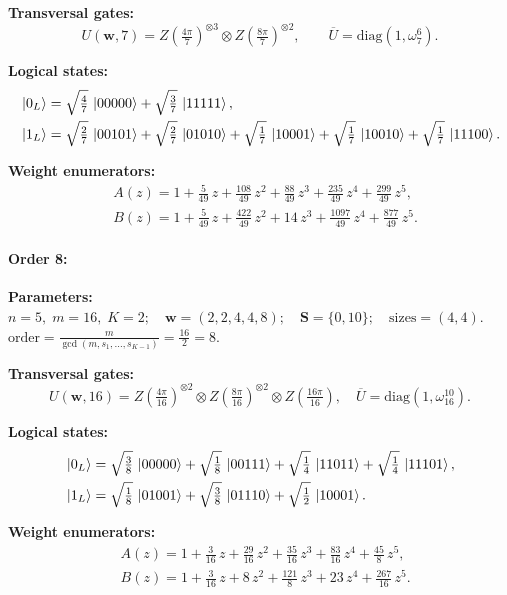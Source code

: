 \documentclass[pdflatex,sn-nature]{sn-jnl}%
\theoremstyle{thmstyleone}%
\theoremstyle{thmstyletwo}%
\theoremstyle{thmstylethree}%
\begin{document}
\begin{appendices}
\noindent\textbf{Transversal gates:}
\[
    U(\mathbf w,7)=Z \left(\tfrac{4\pi}{7}\right)^{\otimes3} \otimes Z \left(\tfrac{8\pi}{7}\right)^{\otimes2},\qquad
    \overline U=\mathrm{diag}(1,\omega_{7}^{6}).
\]

\noindent\textbf{Logical states:}
\begin{align*}
    &\ket{0_L} = \sqrt{\tfrac{4}{7}}\,\ket{00000} + \sqrt{\tfrac{3}{7}}\,\ket{11111}, \\
    &\ket{1_L} = \sqrt{\tfrac{2}{7}}\,\ket{00101} + \sqrt{\tfrac{2}{7}}\,\ket{01010} + \sqrt{\tfrac{1}{7}}\,\ket{10001} + \sqrt{\tfrac{1}{7}}\,\ket{10010} + \sqrt{\tfrac{1}{7}}\,\ket{11100}. 
\end{align*}

\noindent\textbf{Weight enumerators:}
\begin{align*}
    &A(z) = 1 + \tfrac{5}{49}\,z + \tfrac{108}{49}\,z^{2} + \tfrac{88}{49}\,z^{3} + \tfrac{235}{49}\,z^{4} + \tfrac{299}{49}\,z^{5}, \\
    &B(z) = 1 + \tfrac{5}{49}\,z + \tfrac{422}{49}\,z^{2} + 14\,z^{3} + \tfrac{1097}{49}\,z^{4} + \tfrac{877}{49}\,z^{5}.
\end{align*}

\paragraph{\textbf{Order 8:}}
\noindent\textbf{Parameters:} $n=5,\; m=16,\; K=2;\quad \mathbf w=(2, 2, 4, 4, 8);\quad \mathbf S=\{0, 10\};\quad \text{sizes}=\left(4, 4\right).$ $\displaystyle \text{order}=\frac{m}{\gcd(m,s_1,\dots,s_{K-1})}=\frac{16}{2}=8.$

\noindent\textbf{Transversal gates:}
\[
    U(\mathbf w,16)=Z \left(\tfrac{4\pi}{16}\right)^{\otimes2} \otimes Z \left(\tfrac{8\pi}{16}\right)^{\otimes2} \otimes Z \left(\tfrac{16\pi}{16}\right),\quad
    \overline U=\mathrm{diag}(1,\omega_{16}^{10}).
\]

\noindent\textbf{Logical states:}
\begin{align*}
    &\ket{0_L} = \sqrt{\tfrac{3}{8}}\,\ket{00000} + \sqrt{\tfrac{1}{8}}\,\ket{00111} + \sqrt{\tfrac{1}{4}}\,\ket{11011} + \sqrt{\tfrac{1}{4}}\,\ket{11101}, \\
    &\ket{1_L} = \sqrt{\tfrac{1}{8}}\,\ket{01001} + \sqrt{\tfrac{3}{8}}\,\ket{01110} + \sqrt{\tfrac{1}{2}}\,\ket{10001}.
\end{align*}

\noindent\textbf{Weight enumerators:}
\begin{align*}
    &A(z) = 1 + \tfrac{3}{16}\,z + \tfrac{29}{16}\,z^{2} + \tfrac{35}{16}\,z^{3} + \tfrac{83}{16}\,z^{4} + \tfrac{45}{8}\,z^{5}, \\
    &B(z) = 1 + \tfrac{3}{16}\,z + 8\,z^{2} + \tfrac{121}{8}\,z^{3} + 23\,z^{4} + \tfrac{267}{16}\,z^{5}.
\end{align*}



\end{appendices}
\end{document}
